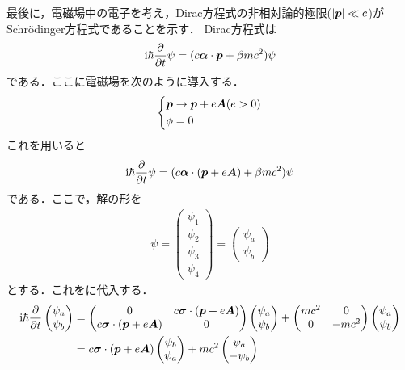 \documentclass{report}
\begin{document}
最後に，電磁場中の電子を考え，Dirac方程式の非相対論的極限($\abs{\bm{p}} \ll c$)がSchrödinger方程式であることを示す．
Dirac方程式は
\begin{align}
  \mathrm{i}\hbar\frac{\partial}{\partial t}\psi = (c \bm{\alpha}\cdot \bm{p} + \beta mc^2)\psi
\end{align}
である．ここに電磁場を次のように導入する．
\begin{align}
  \begin{dcases}
    \bm{p} \to \bm{p} + e\bm{A} (e>0)\\
    \phi = 0
  \end{dcases}
\end{align}
これを用いると
\begin{align}
  \mathrm{i}\hbar\frac{\partial}{\partial t}\psi = (c \bm{\alpha}\cdot (\bm{p} + e\bm{A}) + \beta mc^2)\psi \label{dirac-eq-in-emfield}
\end{align}
である．ここで，解の形を
\begin{align}
  \psi = \begin{pmatrix}
    \psi_1\\\psi_2\\\psi_3\\\psi_4
  \end{pmatrix}
  =
  \begin{pmatrix}
    \psi_a\\
    \psi_b
  \end{pmatrix}
\end{align}
とする．これをに代入する．
\begin{align}
  \mathrm{i}\hbar\frac{\partial}{\partial t}
  \begin{pmatrix}
    \psi_a\\
    \psi_b
  \end{pmatrix}
  &=
  \begin{pmatrix}
    0 & c\bm{\sigma} \cdot (\bm{p} + e \bm{A})\\
    c\bm{\sigma} \cdot (\bm{p} + e \bm{A}) & 0
  \end{pmatrix}
  \begin{pmatrix}
    \psi_a\\
    \psi_b
  \end{pmatrix}
  +
  \begin{pmatrix}
    mc^2 & 0\\
    0 & -mc^2
  \end{pmatrix}
  \begin{pmatrix}
    \psi_a\\
    \psi_b
  \end{pmatrix}\\
  &=
  c\bm{\sigma}\cdot(\bm{p} + e\bm{A})
  \begin{pmatrix}
    \psi_b\\
    \psi_a
  \end{pmatrix}
  +mc^2
  \begin{pmatrix}
    \psi_a\\
    -\psi_b
  \end{pmatrix}
\end{align}
\end{document}
